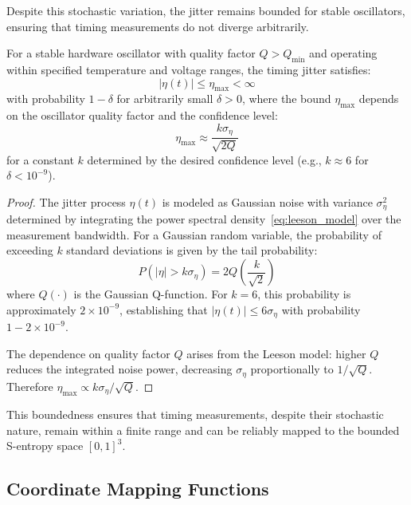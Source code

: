 Despite this stochastic variation, the jitter remains bounded for stable oscillators, ensuring that timing measurements do not diverge arbitrarily.

\begin{proposition}
\label{prop:jitter_boundedness}
For a stable hardware oscillator with quality factor $Q > Q_{\min}$ and operating within specified temperature and voltage ranges, the timing jitter satisfies:
\begin{equation}
|\eta(t)| \leq \eta_{\max} < \infty
\label{eq:jitter_bound}
\end{equation}
with probability $1 - \delta$ for arbitrarily small $\delta > 0$, where the bound $\eta_{\max}$ depends on the oscillator quality factor and the confidence level:
\begin{equation}
\eta_{\max} \approx \frac{k \sigma_\eta}{\sqrt{2Q}}
\label{eq:jitter_max}
\end{equation}
for a constant $k$ determined by the desired confidence level (e.g., $k \approx 6$ for $\delta < 10^{-9}$).
\end{proposition}

\begin{proof}
The jitter process $\eta(t)$ is modeled as Gaussian noise with variance $\sigma_\eta^2$ determined by integrating the power spectral density~\eqref{eq:leeson_model} over the measurement bandwidth. For a Gaussian random variable, the probability of exceeding $k$ standard deviations is given by the tail probability:
\begin{equation}
P(|\eta| > k\sigma_\eta) = 2Q\left(\frac{k}{\sqrt{2}}\right)
\end{equation}
where $Q(\cdot)$ is the Gaussian Q-function. For $k = 6$, this probability is approximately $2 \times 10^{-9}$, establishing that $|\eta(t)| \leq 6\sigma_\eta$ with probability $1 - 2 \times 10^{-9}$.

The dependence on quality factor $Q$ arises from the Leeson model: higher $Q$ reduces the integrated noise power, decreasing $\sigma_\eta$ proportionally to $1/\sqrt{Q}$. Therefore $\eta_{\max} \propto k\sigma_\eta / \sqrt{Q}$.
\end{proof}

This boundedness ensures that timing measurements, despite their stochastic nature, remain within a finite range and can be reliably mapped to the bounded S-entropy space $[0,1]^3$.

\subsection{Coordinate Mapping Functions}

